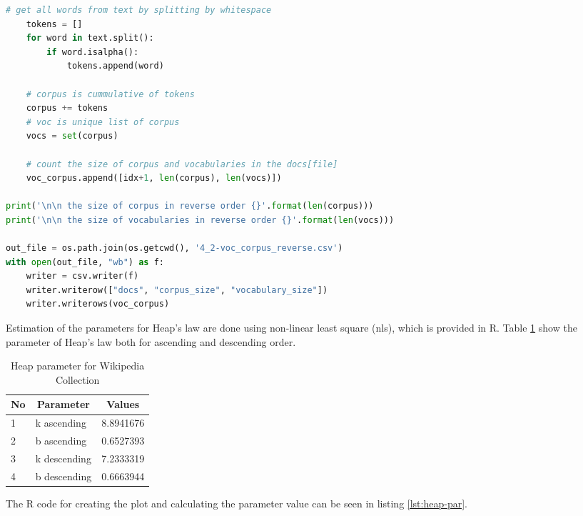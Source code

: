 \documentclass[letterpaper,11pt]{article}
\begin{document}
\begin{lstlisting}[language=python, caption={Source code for calculating vocabulary growth}, label={lst:vocab-growth}]
    # get all words from text by splitting by whitespace
    tokens = []
    for word in text.split():
        if word.isalpha():
            tokens.append(word)

    # corpus is cummulative of tokens
    corpus += tokens
    # voc is unique list of corpus
    vocs = set(corpus)

    # count the size of corpus and vocabularies in the docs[file]
    voc_corpus.append([idx+1, len(corpus), len(vocs)])

print('\n\n the size of corpus in reverse order {}'.format(len(corpus)))
print('\n\n the size of vocabularies in reverse order {}'.format(len(vocs)))

out_file = os.path.join(os.getcwd(), '4_2-voc_corpus_reverse.csv')
with open(out_file, "wb") as f:
    writer = csv.writer(f)
    writer.writerow(["docs", "corpus_size", "vocabulary_size"])
    writer.writerows(voc_corpus)

\end{lstlisting}

Estimation of the parameters for Heap's law are done using non-linear least square (nls), which is provided in R. Table \ref{tab:heap-par} show the parameter of Heap's law both for ascending and descending order. 

\begin{table}[H]
\centering
\begin{tabular}{|l|l|l|}
\hline
\multicolumn{1}{|c|}{\textbf{No}} & \multicolumn{1}{c|}{\textbf{Parameter}} & \multicolumn{1}{c|}{\textbf{Values}} \\ \hline
1 & k ascending & 8.8941676 \\ \hline
2 & b ascending & 0.6527393 \\ \hline
3 & k descending & 7.2333319 \\ \hline
4 & b descending & 0.6663944 \\ \hline
\end{tabular}
\caption{Heap parameter for Wikipedia Collection}
\label{tab:heap-par}
\end{table}

The R code for creating the plot and calculating the parameter value can be seen in listing \ref{lst:heap-par}.
\end{document}
